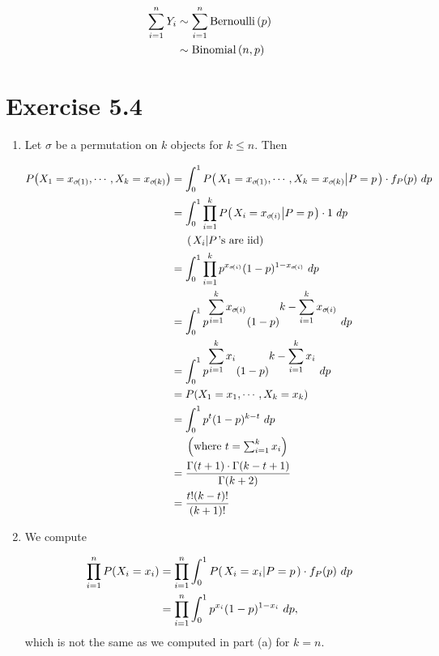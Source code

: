 \documentclass[12pt,letterpaper,reqno]{amsart}
\numberwithin{equation}{subsection}
\begin{document}
\begin{align*}
    \sum_{i=1}^n Y_i &\sim \sum_{i=1}^n \bernoullidist{p} \\
    &\sim \binomdist{n, p}
\end{align*}

\newpage
\section{Exercise 5.4}

\begin{enumerate}[label=(\alph*),leftmargin=*]
    \item Let $\sigma$ be a permutation on $k$ objects for $k \leq n$. Then
    
    \begin{align*}
        \fun{P}{X_1 = x_{\fun{\sigma}{1}}, \cdots, X_k = x_{\fun{\sigma}{k}}}
        &= \myint{\fun{P}{\conditbar{X_1 = x_{\fun{\sigma}{1}}, \cdots, X_k = x_{\fun{\sigma}{k}}}{P=p}} \cdot \fun{f_P}{p}}{p}{0}{1} \\
        &= \myint{\prod_{i=1}^k \fun{P}{\conditbar{X_i = x_{\fun{\sigma}{i}}}{P=p}} \cdot 1}{p}{0}{1} \\
        & \ \ \ \ \left( \mbox{$\conditbar{X_i}{P}$'s are iid} \right) \\
        &= \myint{\prod_{i=1}^k p^{x_{\fun{\sigma}{i}}} (1-p)^{1-x_{\fun{\sigma}{i}}}}{p}{0}{1} \\
        &= \myint{p^{\displaystyle \sum_{i=1}^k x_{\fun{\sigma}{i}}} (1-p)^{\displaystyle k - \sum_{i=1}^k x_{\fun{\sigma}{i}}}}{p}{0}{1} \\
        &= \myint{p^{\displaystyle \sum_{i=1}^k x_{i}} (1-p)^{\displaystyle k - \sum_{i=1}^k x_{i}}}{p}{0}{1} \\
        &= \fun{P}{X_1 = x_1, \cdots, X_k = x_k} \\
        &= \myint{p^t(1-p)^{k-t}}{p}{0}{1} \\
        & \ \ \ \ \left(\mbox{where $t = \sum_{i=1}^k x_i$} \right) \\
        &= \frac{\fun{\Gamma}{t+1} \cdot \fun{\Gamma}{k-t+1}}{\fun{\Gamma}{k+2}} \\
        &= \frac{t!(k-t)!}{(k+1)!}
    \end{align*}
    
    \item We compute
    
    \begin{align*}
        \prod_{i=1}^n \fun{P}{X_i = x_i} &= \prod_{i=1}^n \myint{\fun{P}{\conditbar{X_i = x_i}{P=p}} \cdot \fun{f_P}{p}}{p}{0}{1} \\
        &= \prod_{i=1}^n \myint{p^{x_i} (1-p)^{1-x_i}}{p}{0}{1},
    \end{align*}
    which is not the same as we computed in part (a) for $k=n$.
\end{enumerate}
\end{document}
